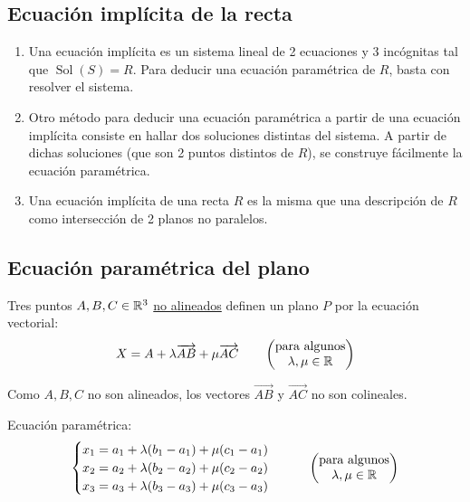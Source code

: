 \documentclass[11pt,a4paper]{article}
\DeclareMathOperator{\Sol}{Sol}
\begin{document}
\subsection{Ecuación implícita de la recta}

\begin{observacion}\leavevmode
\begin{enumerate}[label=(\arabic*)]
  \item Una ecuación implícita es un sistema lineal de 2 ecuaciones y 3 incógnitas tal que $\Sol(S)=R$. Para deducir una ecuación paramétrica de $R$, basta con resolver el sistema.
  \item Otro método para deducir una ecuación paramétrica a partir de una ecuación implícita consiste en hallar dos soluciones distintas del sistema. A partir de dichas soluciones (que son 2 puntos distintos de $R$), se construye fácilmente la ecuación paramétrica.
  \item Una ecuación implícita de una recta $R$ es la misma que una descripción de $R$ como intersección de 2 planos no paralelos.
\end{enumerate}
\end{observacion}

\subsection{Ecuación paramétrica del plano}

\begin{definicion}
Tres puntos $A,B,C\in\mathbb{R}^3$ \underline{no alineados} definen un plano $P$ por la ecuación vectorial:
\[
X=A+\lambda\overrightarrow{AB}+\mu\overrightarrow{AC}
\qquad
\begin{pmatrix}\text{para algunos}\\\lambda,\mu\in\mathbb{R}\end{pmatrix}
\]
\end{definicion}

\begin{observacion}
Como $A,B,C$ no son alineados, los vectores $\overrightarrow{AB}$ y $\overrightarrow{AC}$ no son colineales.
\end{observacion}

Ecuación paramétrica:
\[
\begin{cases}
x_1=a_1+\lambda(b_1-a_1)+\mu(c_1-a_1)\\
x_2=a_2+\lambda(b_2-a_2)+\mu(c_2-a_2)\\
x_3=a_3+\lambda(b_3-a_3)+\mu(c_3-a_3)
\end{cases}
\qquad
\begin{pmatrix}\text{para algunos}\\\lambda,\mu\in\mathbb{R}\end{pmatrix}
\]
\end{document}
